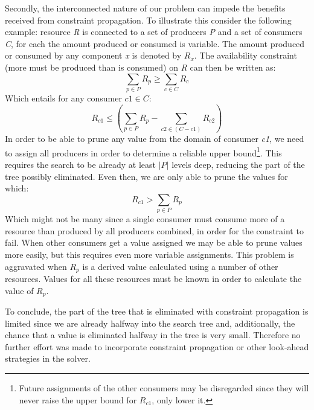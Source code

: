 Secondly, the interconnected nature of our problem can impede the benefits received from constraint propagation. To illustrate this consider the following example: resource \emph{R} is connected to a set of producers \emph{P} and a set of consumers \emph{C}, for each the amount produced or consumed is variable. The amount produced or consumed by any component \emph{x} is denoted by $R_x$. The availability constraint (more must be produced than is consumed) on \emph{R} can then be written as:
$$\sum_{p \in P}R_p \geq \sum_{c \in C}R_c$$
Which entails for any consumer $c1 \in C$: 
$$R_{c1} \leq \left(\sum_{p \in P} R_p - \sum_{c2 \in (C-c1)} R_{c2}\right)$$
In order to be able to prune any value from the domain of consumer \emph{c1}, we need to assign all producers in order to determine a reliable upper bound\footnote{Future assignments of the other consumers may be disregarded since they will never raise the upper bound for $R_{c1}$, only lower it.}. This requires the search to be already at least $|P|$ levels deep, reducing the part of the tree possibly eliminated. Even then, we are only able to prune the values for which:
$$R_{c1} > \sum_{p \in P} R_p$$
Which might not be many since a single consumer must consume more of a resource than produced by all producers combined, in order for the constraint to fail. When other consumers get a value assigned we may be able to prune values more easily, but this requires even more variable assignments. This problem is aggravated when $R_p$ is a derived value calculated using a number of other resources. Values for all these resources must be known in order to calculate the value of $R_p$.

To conclude, the part of the tree that is eliminated with constraint propagation is limited since we are already halfway into the search tree and, additionally, the chance that a value is eliminated halfway in the tree is very small. Therefore no further effort was made to incorporate constraint propagation or other look-ahead strategies in the solver.



	









